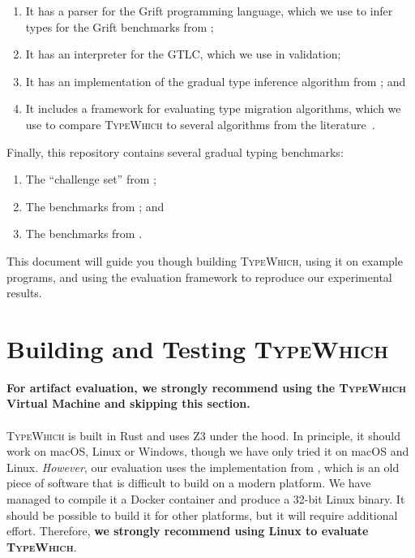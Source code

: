 \documentclass{book}
\newcommand{\system}{\textsc{TypeWhich}\xspace}
\begin{document}
\begin{enumerate}

  \item It has a parser for the Grift programming language, which we use to
  infer types for the Grift benchmarks from \citet{kuhlenschmidt:grift};

  \item It has an interpreter for the GTLC, which we use in validation;
  
  \item It has an implementation of the gradual type inference algorithm
  from \citet{rastogi:gti}; and

  \item It includes a framework for evaluating type migration algorithms,
  which we use to compare \system to several algorithms from the
  literature~\cite{rastogi:gti,campora:migrating,migeed:decidable,siek:gti}.

\end{enumerate}
%
Finally, this repository contains several gradual typing benchmarks:
%
\begin{enumerate}

     \item The ``challenge set'' from \citet{typewhich};
     
     \item The benchmarks from \citet{migeed:decidable}; and
     
     \item The benchmarks from \citet{kuhlenschmidt:grift}.

\end{enumerate}

This document will guide you though building \system, using it on example
programs, and using the evaluation framework to reproduce our experimental
results.

\section{Building and Testing \system}

\noindent
\textbf{For artifact evaluation, we strongly recommend using the \system
Virtual Machine and skipping this section.}

\paragraph{}
\system is built in Rust and uses Z3 under the hood. In principle, it should
work on macOS, Linux or Windows, though we have only tried it on macOS and
Linux. \emph{However}, our evaluation uses the implementation from
\citet{siek:gti}, which is an old piece of software that is difficult to build
on a modern platform. We have managed to compile it a Docker container and
produce a 32-bit Linux binary. It should be possible to build it for other
platforms, but it will require additional effort. Therefore, \textbf{we strongly
recommend using Linux to evaluate \system}.
\end{document}
